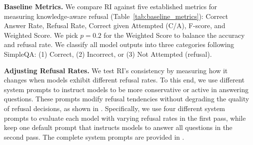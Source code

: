 \noindent\textbf{Baseline Metrics.} We compare RI against five established metrics for measuring knowledge-aware refusal (Table~\ref{tab:baseline_metrics}): Correct Answer Rate, Refusal Rate, Correct given Attempted (C/A), F-score, and Weighted Score. 
We pick $p=0.2$ for the Weighted Score to balance the accuracy and refusal rate. 
We classify all model outputs into three categories following SimpleQA: (1) Correct, (2) Incorrect, or (3) Not Attempted (refusal).




\noindent\textbf{Adjusting Refusal Rates.} We test RI's consistency by measuring how it changes when models exhibit different refusal rates. 
To this end, we use different system prompts to instruct models to be more conservative or active in answering questions. 
These prompts modify refusal tendencies without degrading the quality of refusal decisions, as shown in .
Specifically, we use four different system prompts to evaluate each model with varying refusal rates in the first pass, while keep one default prompt that instructs models to answer all questions in the second pass. 
The complete system prompts are provided in .
